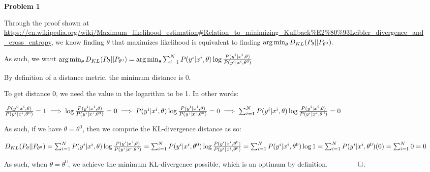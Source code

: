 \textbf{Problem 1}

Through the proof shown at \url{https://en.wikipedia.org/wiki/Maximum\_likelihood\_estimation#Relation\_to\_minimizing\_Kullback\%E2\%80\%93Leibler_divergence_and_cross_entropy}, we know finding $\theta$ that maximizes likelihood is equivalent to finding $\operatorname*{arg\,min}_\theta D_{KL}(P_\theta \vert\vert P_{\theta^0})$.

As such, we want $\operatorname*{arg\,min}_\theta D_{KL}(P_\theta \vert\vert P_{\theta^0}) = \operatorname*{arg\,min}_\theta \sum_{i=1}^{N} P(y^i \vert x^i, \theta)\log\frac{P(y^i \vert x^i, \theta)}{P(y^i \vert x^i, \theta^0)}$

By definition of a distance metric, the minimum distance is 0.

To get distance 0, we need the value in the logarithm to be 1. In other words:

$\frac{P(y^i \vert x^i, \theta)}{P(y^i \vert x^i, \theta^0)} = 1 \\
\implies \log\frac{P(y^i \vert x^i, \theta)}{P(y^i \vert x^i, \theta^0)} = 0 \\ \implies P(y^i \vert x^i, \theta)\log\frac{P(y^i \vert x^i, \theta)}{P(y^i \vert x^i, \theta^0)} = 0 \\
\implies \sum_{i=1}^{N} P(y^i \vert x^i, \theta)\log\frac{P(y^i \vert x^i, \theta)}{P(y^i \vert x^i, \theta^0)} = 0$

As such, if we have $\theta = \theta^0$, then we compute the KL-divergence distance as so:

$D_{KL}(P_\theta \vert\vert P_{\theta^0}) \\
= \sum_{i=1}^{N} P(y^i \vert x^i, \theta)\log\frac{P(y^i \vert x^i, \theta)}{P(y^i \vert x^i, \theta^0)} \\
= \sum_{i=1}^{N} P(y^i \vert x^i, \theta^0)\log\frac{P(y^i \vert x^i, \theta^0)}{P(y^i \vert x^i, \theta^0)} \\
= \sum_{i=1}^{N} P(y^i \vert x^i, \theta^0)\log 1 \\
= \sum_{i=1}^{N} P(y^i \vert x^i, \theta^0)(0) \\
= \sum_{i=1}^{N} 0 \\
= 0 $

As such, when $\theta = \theta^0$, we achieve the minimum KL-divergence possible, which is an optimum by definition. $\qquad\qed$.